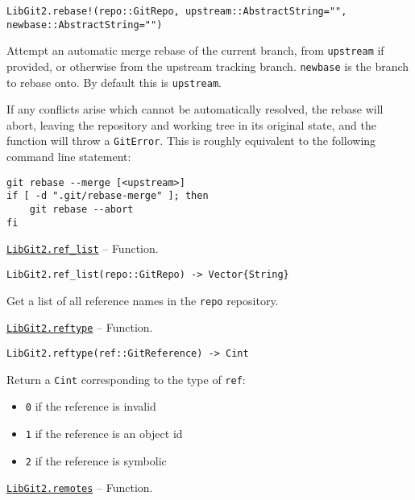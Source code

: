 \begin{adjustwidth}{2em}{0pt}


\begin{verbatim}
LibGit2.rebase!(repo::GitRepo, upstream::AbstractString="", newbase::AbstractString="")
\end{verbatim}

Attempt an automatic merge rebase of the current branch, from \texttt{upstream} if provided, or otherwise from the upstream tracking branch. \texttt{newbase} is the branch to rebase onto. By default this is \texttt{upstream}.

If any conflicts arise which cannot be automatically resolved, the rebase will abort, leaving the repository and working tree in its original state, and the function will throw a \texttt{GitError}. This is roughly equivalent to the following command line statement:


\begin{lstlisting}
git rebase --merge [<upstream>]
if [ -d ".git/rebase-merge" ]; then
    git rebase --abort
fi
\end{lstlisting}



\end{adjustwidth}
\hypertarget{12847926185465464483}{} 
\hyperlink{12847926185465464483}{\texttt{LibGit2.ref\_list}}  -- {Function.}

\begin{adjustwidth}{2em}{0pt}


\begin{verbatim}
LibGit2.ref_list(repo::GitRepo) -> Vector{String}
\end{verbatim}

Get a list of all reference names in the \texttt{repo} repository.



\end{adjustwidth}
\hypertarget{5156390520855755168}{} 
\hyperlink{5156390520855755168}{\texttt{LibGit2.reftype}}  -- {Function.}

\begin{adjustwidth}{2em}{0pt}


\begin{verbatim}
LibGit2.reftype(ref::GitReference) -> Cint
\end{verbatim}

Return a \texttt{Cint} corresponding to the type of \texttt{ref}:

\begin{itemize}
\item \texttt{0} if the reference is invalid


\item \texttt{1} if the reference is an object id


\item \texttt{2} if the reference is symbolic

\end{itemize}


\end{adjustwidth}
\hypertarget{5507389887346241045}{} 
\hyperlink{5507389887346241045}{\texttt{LibGit2.remotes}}  -- {Function.}

